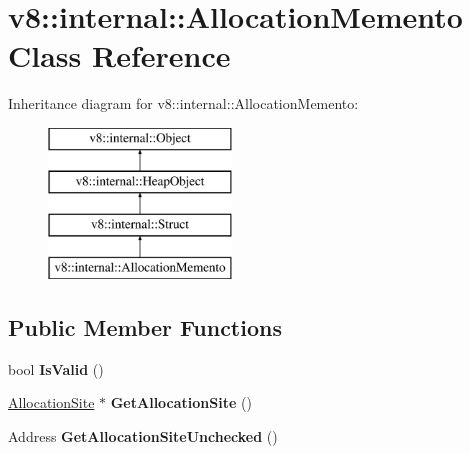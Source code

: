 \hypertarget{classv8_1_1internal_1_1_allocation_memento}{}\section{v8\+:\+:internal\+:\+:Allocation\+Memento Class Reference}
\label{classv8_1_1internal_1_1_allocation_memento}
Inheritance diagram for v8\+:\+:internal\+:\+:Allocation\+Memento\+:\begin{figure}[H]
\begin{center}
\leavevmode
\includegraphics[height=4.000000cm]{classv8_1_1internal_1_1_allocation_memento}
\end{center}
\end{figure}
\subsection*{Public Member Functions}
\begin{DoxyCompactItemize}
\item 
bool {\bfseries Is\+Valid} ()\hypertarget{classv8_1_1internal_1_1_allocation_memento_add097e221c27cfdae3cc58466d9decab}{}\label{classv8_1_1internal_1_1_allocation_memento_add097e221c27cfdae3cc58466d9decab}

\item 
\hyperlink{classv8_1_1internal_1_1_allocation_site}{Allocation\+Site} $\ast$ {\bfseries Get\+Allocation\+Site} ()\hypertarget{classv8_1_1internal_1_1_allocation_memento_a1c22fe44c3a621ff2f88239f7efb042c}{}\label{classv8_1_1internal_1_1_allocation_memento_a1c22fe44c3a621ff2f88239f7efb042c}

\item 
Address {\bfseries Get\+Allocation\+Site\+Unchecked} ()\hypertarget{classv8_1_1internal_1_1_allocation_memento_af20d0fce1d25f3f996fcf24a658cc113}{}\label{classv8_1_1internal_1_1_allocation_memento_af20d0fce1d25f3f996fcf24a658cc113}

\end{DoxyCompactItemize}
